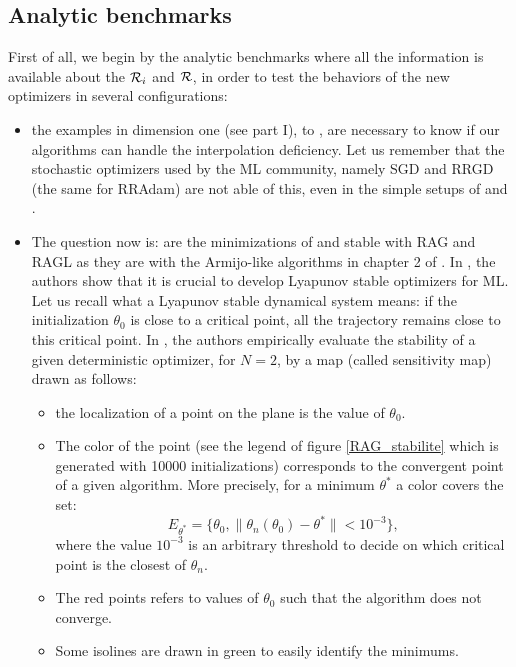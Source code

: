 \subsection{Analytic benchmarks}
\label{test_analytic}

First of all, we begin by the analytic benchmarks where all the information is available about the $\mathcal{R}_i$ and $\mathcal{R}$, in order to test the behaviors of the new optimizers in several configurations:
\begin{itemize}
  \item the examples in dimension one (see part I), \exOne to \exHeight, are necessary to know if our algorithms can handle the interpolation deficiency. Let us remember that the stochastic optimizers used by the ML community, namely SGD and RRGD (the same for RRAdam) are not able of this, even in the simple setups of \exOne and \exTwo. 
	\item The question now is: are the minimizations of \polyTwo and \polyThree stable with RAG and RAGL as they are with the Armijo-like algorithms in chapter 2 of \cite{Bilel_thesis}. In \cite{Bilel}, the authors show that it is crucial to develop Lyapunov stable optimizers for ML. Let us recall what a Lyapunov stable dynamical system means: if the initialization $\theta_0$ is close to a critical point, all the trajectory remains close to this critical point. In \cite{Bilel}, the authors empirically evaluate the stability of a given deterministic optimizer, for $N=2$, by a map (called sensitivity map) drawn as follows:
	\begin{itemize}
		\item the localization of a point on the plane is the value of $\theta_0$.
		\item The color of the point (see the legend of figure \ref{RAG_stabilite} which is generated with 10000 initializations) corresponds to the convergent point of a given algorithm. More precisely, for a minimum $\theta^*$ a color covers the set:
		\begin{equation*}
			E_{\theta^*} = \{ \theta_0, \|\theta_n(\theta_0)-\theta^*\| < 10^{-3} \},
		\end{equation*}
		where the value $10^{-3}$ is an arbitrary threshold to decide on which critical point is the closest of $\theta_n$.
		\item The red points refers to values of $\theta_0$ such that the algorithm does not converge.
		\item Some isolines are drawn in green to easily identify the minimums.
	\end{itemize}

\end{itemize}
